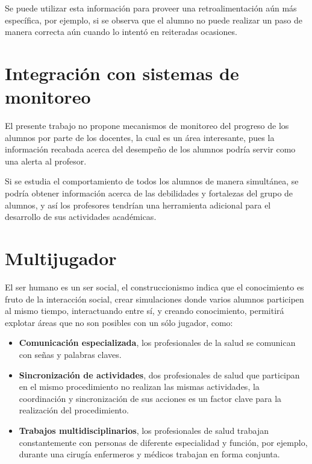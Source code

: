 Se puede utilizar esta información para proveer una retroalimentación aún más
específica, por ejemplo, si se observa que el alumno no puede realizar un paso
de manera correcta aún cuando lo intentó en reiteradas ocasiones.

\section{Integración con sistemas de monitoreo}

El presente trabajo no propone mecanismos de monitoreo del progreso de los
alumnos por parte de los docentes, la cual es un área interesante, pues la
información recabada acerca del desempeño de los alumnos podría servir como una
alerta al profesor.

Si se estudia el comportamiento de todos los alumnos de manera simultánea, se
podría obtener información acerca de las debilidades y fortalezas del grupo de
alumnos, y así los profesores tendrían una herramienta adicional para el
desarrollo de sus actividades académicas.

\section{Multijugador}

El ser humano es un ser social, el construccionismo indica que el conocimiento
es fruto de la interacción social, crear simulaciones donde varios alumnos
participen al mismo tiempo, interactuando entre sí, y creando conocimiento,
permitirá explotar áreas que no son posibles con un sólo jugador, como:

\begin{itemize}
    \item \textbf{Comunicación especializada}, los profesionales de la salud se
        comunican con señas y palabras claves.
    \item \textbf{Sincronización de actividades}, dos profesionales de salud que
        participan en el mismo procedimiento no realizan las mismas actividades,
        la coordinación y sincronización de sus acciones es un factor clave para
        la realización del procedimiento.
    \item \textbf{Trabajos multidisciplinarios}, los profesionales de salud trabajan
        constantemente con personas de diferente especialidad y función, por
        ejemplo, durante una cirugía enfermeros y médicos trabajan en forma
        conjunta.
\end{itemize}

